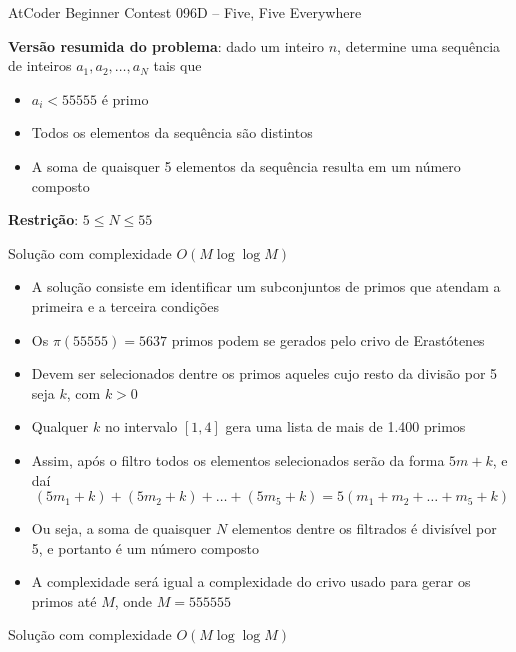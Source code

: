\begin{frame}[fragile]{AtCoder Beginner Contest 096D -- Five, Five Everywhere}

    \textbf{Versão resumida do problema}: dado um inteiro $n$, determine uma sequência de inteiros
        $a_1, a_2, \ldots, a_N$ tais que

    \begin{itemize}
        \item $a_i < 55555$ é primo
        \item Todos os elementos da sequência são distintos
        \item A soma de quaisquer 5 elementos da sequência resulta em um número composto
    \end{itemize}

    \vspace{0.1in}
    \textbf{Restrição}: $5 \leq N \leq 55$

\end{frame}

\begin{frame}[fragile]{Solução com complexidade $O(M\log \log M)$}

    \begin{itemize}
        \item A solução consiste em identificar um subconjuntos de primos que atendam a primeira
            e a terceira condições

        \item Os $\pi(55555) = 5637$ primos podem se gerados pelo crivo de Erastótenes

        \item Devem ser selecionados dentre os primos aqueles cujo resto da divisão por 5 seja
            $k$, com $k > 0$

        \item Qualquer $k$ no intervalo $[1, 4]$ gera uma lista de mais de 1.400 primos

        \item Assim, após o filtro todos os elementos selecionados serão da forma $5m + k$, e 
            daí
        $$
            (5m_1 + k) + (5m_2 + k) + \ldots + (5m_5 + k) = 5(m_1 + m_2 + \ldots + m_5 + k)
        $$

        \item Ou seja, a soma de quaisquer $N$ elementos dentre os filtrados é 
            divisível por 5, e portanto é um número composto

        \item A complexidade será igual a complexidade do crivo usado para gerar os primos até
            $M$, onde $M = 555555$
    \end{itemize}

\end{frame}

\begin{frame}[fragile]{Solução com complexidade $O(M\log \log M)$}
\end{frame}
